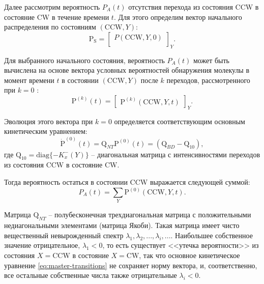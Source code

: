 Далее рассмотрим вероятность $P_A(t)$ отсутствия перехода из состояния CCW в состояние CW в течение времени $t$. Для этого определим вектор начального распределения по состояниям $(\mathrm{CCW}, Y)$:
\begin{equation}
    \boldsymbol{\mathrm{P_S}} = 
    \begin{bmatrix} P(\mathrm{CCW}, Y, 0)\\ \end{bmatrix}_Y.
    \label{eq:start-prob}
\end{equation}

Для выбранного начального состояния, вероятность $P_A(t)$ может быть вычислена на основе вектора условных вероятностей обнаружения молекулы в момент времени $t$ в состоянии $(\mathrm{CCW}, Y)$ после $k$ переходов, рассмотренного при $k=0$ \cite{mordovina_full-counting_2013}: 
\begin{equation}
    \boldsymbol{\mathrm{P}}^{(k)}(t) = \begin{bmatrix} \boldsymbol{\mathrm{P}}^{(k)}(\mathrm{CCW}, Y, t)\end{bmatrix}_Y.
    \label{eq:conditioned-transitions}
\end{equation}

Эволюция этого вектора при $k=0$ определяется соответствующим основным кинетическим уравнением:
\begin{equation}
    \dot{\boldsymbol{\mathrm{P}}}^{(0)}(t)=\boldsymbol{\mathrm{Q}}_{NT}\mathrm{P}^{(0)}(t) = \left (\boldsymbol{\mathrm{Q}}_{BD} - \boldsymbol{\mathrm{Q}}_{10} \right ),
    \label{eq:conditioned-master-transtions}
\end{equation}
где $\boldsymbol{\mathrm{Q}}_{10} = \mathrm{diag}\{-K^-_x(Y)\}$ -- диагональная матрица с интенсивностями переходов из состояния CCW в состояние CW.

Тогда вероятность остаться в состоянии CCW выражается следующей суммой:
\begin{equation}
    P_A(t) = \sum_Y \mathrm{P}^{(0)}(\mathrm{CCW},Y,t).
    \label{eq:no-transition-prob}
\end{equation}

Матрица $\boldsymbol{\mathrm{Q}}_{NT}$ -- полубесконечная трехдиагональная матрица с положительными недиагональными элементами (матрица Якоби). Такая матрица имеет чисто вещественный невырожденный спектр ${\lambda_1, \lambda_2, ..., \lambda_i, ...}$. Наибольшее собственное значение отрицательное, $\lambda_1 < 0$, то есть существует <<утечка вероятности>> из состояния $X = \mathrm{CCW}$ в состояние $X = \mathrm{CW}$, так что основное кинетическое уравнение \cref{eq:master-transitions} не сохраняет норму вектора, и, соответственно, все остальные собственные числа также отрицательные $\lambda_i < 0$. 

